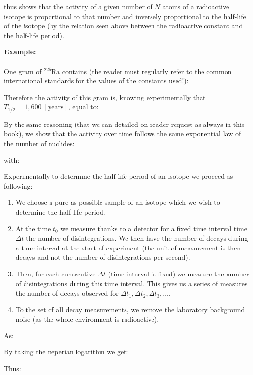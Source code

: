 	thus shows that the activity of a given number of $N$ atoms of a radioactive isotope is proportional to that number and inversely proportional to the half-life of the isotope (by the relation seen above between the radioactive constant and the half-life period).
	\begin{tcolorbox}[colframe=black,colback=white,sharp corners]
	\textbf{{\Large {}}Example:}\\\\
	One gram of ${^{225}\mathrm{Ra}}$ contains (the reader must regularly refer to the common international standards for the values of the constants used!):
	
	Therefore the activity of this gram is, knowing experimentally that $T_{1/2}=1,600\;[\text{years}]$, equal to:
	
	\end{tcolorbox}
	By the same reasoning (that we can detailed on reader request as always in this book), we show that the activity over time follows the same exponential law of the number of nuclides:
	
	with:
	
	Experimentally to determine the half-life period of an isotope we proceed as following:
	\begin{enumerate}
		\item We choose a pure as possible sample of an isotope which we wish to determine the half-life period.

		\item 	At the time $t_0$ we measure thanks to a detector for a fixed time interval time $\Delta t$ the number of disintegrations. We then have the number of decays during a time interval at the start of experiment (the unit of measurement is then decays and not the number of disintegrations per second).

		\item Then, for each consecutive $\Delta t$ (time interval is fixed) we measure the number of disintegrations during this time interval. This gives us a series of measures the number of decays observed for $\Delta t_1, \Delta t_2, \Delta t_3,\ldots$.
		
		\item To the set of all decay measurements, we remove the laboratory background noise (as the whole environment is radioactive).
	\end{enumerate}
	As:
	
	By taking the neperian logarithm we get:
	
	Thus:
	
